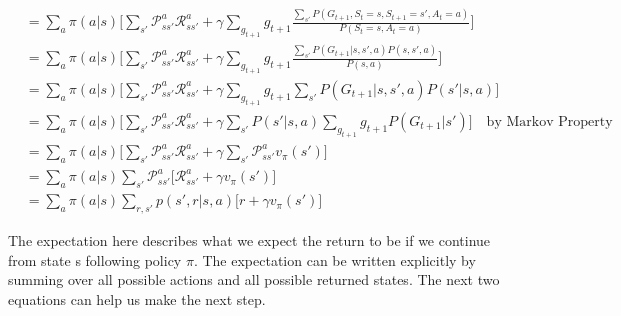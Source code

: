 \begin{appendices}
\begin{align*}
&=\sum_a \pi(a|s)\Bigg[\sum_{s'} \mathcal{P}_{ss'}^a\mathcal{R}_{ss'}^a + \gamma \sum_{g_{t+1}}g_{t+1}\frac{\sum_{s'}P( G_{t+1},S_t = s, S_{t+1}=s', A_{t}=a)}{P(S_t = s, A_{t}=a)}\Bigg]\\
&=\sum_a \pi(a|s)\Bigg[\sum_{s'} \mathcal{P}_{ss'}^a\mathcal{R}_{ss'}^a + \gamma \sum_{g_{t+1}}g_{t+1}\frac{\sum_{s'}P( G_{t+1}|s, s', a)P(s, s', a)}{P(s, a)}\Bigg]\\
&=\sum_a \pi(a|s)\Bigg[\sum_{s'} \mathcal{P}_{ss'}^a\mathcal{R}_{ss'}^a + \gamma \sum_{g_{t+1}}g_{t+1}\sum_{s'}P( G_{t+1}|s, s', a)P(s'| s, a)\Bigg]\\
&=\sum_a \pi(a|s)\Bigg[\sum_{s'} \mathcal{P}_{ss'}^a\mathcal{R}_{ss'}^a + \gamma \sum_{s'}P(s'| s, a)\sum_{g_{t+1}}g_{t+1}P( G_{t+1}|s')\Bigg] \quad \textrm{by Markov Property}\\
&=\sum_a \pi(a|s)\Bigg[\sum_{s'} \mathcal{P}_{ss'}^a\mathcal{R}_{ss'}^a + \gamma \sum_{s'}\mathcal{P}_{ss'}^a v_\pi(s')\Bigg] \\
&=\sum_a \pi(a|s)\sum_{s'}\mathcal{P}_{ss'}^a\Bigg[\mathcal{R}_{ss'}^a + \gamma  v_\pi(s')\Bigg] \\
&=\sum_a \pi(a|s)\sum_{r,s'}p(s',r|s,a)\Big[r + \gamma  v_\pi(s')\Big] 
\end{align*}

The expectation here describes what we expect the return to be if we continue from state s following policy $\pi$. The expectation can be written explicitly by summing over all possible actions and all possible returned states. The next two equations can help us make the next step.


\end{appendices}
